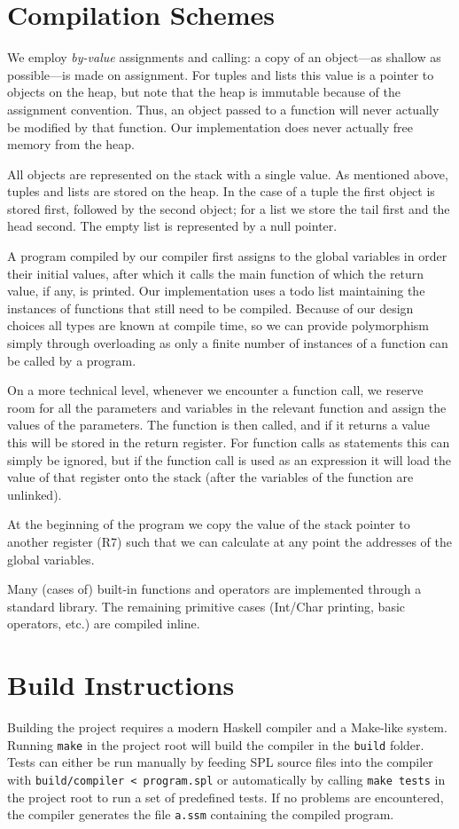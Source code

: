 \documentclass[a4paper]{article}
\begin{document}
\section{Compilation Schemes}

We employ \emph{by-value} assignments and calling: a copy of an object---as shallow as possible---is made on assignment.
For tuples and lists this value is a pointer to objects on the heap, but note that the heap is immutable because of the assignment convention.
Thus, an object passed to a function will never actually be modified by that function.
Our implementation does never actually free memory from the heap. %

All objects are represented on the stack with a single value.
As mentioned above, tuples and lists are stored on the heap.
In the case of a tuple the first object is stored first, followed by the second object; for a list we store the tail first and the head second.
The empty list is represented by a null pointer.

A program compiled by our compiler first assigns to the global variables in order their initial values, after which it calls the main function of which the return value, if any, is printed.
Our implementation uses a todo list maintaining the instances of functions that still need to be compiled.
Because of our design choices all types are known at compile time, so we can provide polymorphism simply through overloading as only a finite number of instances of a function can be called by a program.

On a more technical level, whenever we encounter a function call, we reserve room for all the parameters and variables in the relevant function and assign the values of the parameters.
The function is then called, and if it returns a value this will be stored in the return register.
For function calls as statements this can simply be ignored, but if the function call is used as an expression it will load the value of that register onto the stack (after the variables of the function are unlinked).

At the beginning of the program we copy the value of the stack pointer to another register (R7) such that we can calculate at any point the addresses of the global variables.

Many (cases of) built-in functions and operators are implemented through a standard library.
The remaining primitive cases (Int/Char printing, basic operators, etc.) are compiled inline.

\section{Build Instructions}

Building the project requires a modern Haskell compiler and a Make-like system.
Running \verb|make| in the project root will build the compiler in the \verb|build| folder.
Tests can either be run manually by feeding SPL source files into the compiler with \verb|build/compiler < program.spl| or automatically by calling \verb|make tests| in the project root to run a set of predefined tests.
If no problems are encountered, the compiler generates the file \verb|a.ssm| containing the compiled program.
\end{document}
